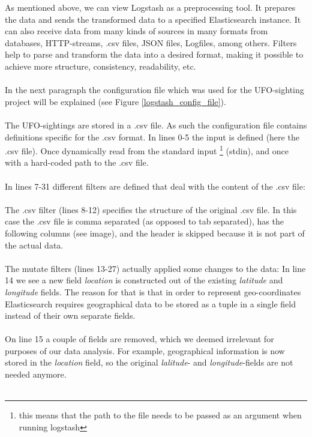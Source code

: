 \documentclass[bibliography=totoc]{article}
\begin{document}
As mentioned above, we can view Logstash as a preprocessing tool.
It prepares the data and sends the transformed data to a specified 
Elasticsearch instance.
It can also receive data from many kinds of sources in many formats from databases, HTTP-streams, 
.csv files, JSON files, Logfiles, among others. Filters help to parse and transform the data into a
desired format, making it possible to achieve more structure, consistency,
readability, etc.
\\
\\
In the next paragraph the configuration file which was used for the
UFO-sighting project will be explained (see Figure \ref{logstash_config_file}).
\\
\\
The UFO-sightings are stored in a .csv file. As such the configuration file 
contains definitions specific for the .csv format. In lines 0-5 the input is defined (here the .csv file).
Once dynamically read from the standard input \footnote{this means that the path to the file needs to be
passed as an argument when running logstash} (stdin),
and once with a hard-coded path to the .csv file.
\\
\\
In lines 7-31 different filters are defined that deal with the content 
of the .csv file:
\\
\\
The .csv filter (lines 8-12) specifies the structure of the original .csv file.
In this case the .csv file is comma separated (as opposed to tab separated),
has the following columns (see image), and the header is skipped because
it is not part of the actual data.
\\
\\
The mutate filters (lines 13-27) actually applied some changes to the data:
In line 14 we see a new field \textit{location} is constructed out of the 
existing \textit{latitude} and \textit{longitude} fields. The reason for 
that is that in order to represent geo-coordinates Elasticsearch requires geographical data to be stored as a tuple in a single field instead of their own separate fields.
\\
\\
On line 15 a couple of fields are removed, which we deemed irrelevant
for purposes of our data analysis. For example, geographical information is now 
stored in the \textit{location} field, so the original \textit{lalitude}- and \textit{longitude}-fields
are not needed anymore.
\\
\\
\end{document}
